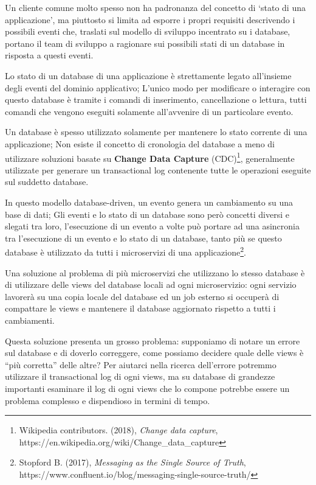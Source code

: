 \documentclass[]{article}
\begin{document}
Un cliente comune molto spesso non ha padronanza del concetto di `stato
di una applicazione', ma piuttosto si limita ad esporre i propri
requisiti descrivendo i possibili eventi che, traslati sul modello di
sviluppo incentrato su i database, portano il team di sviluppo a
ragionare sui possibili stati di un database in risposta a questi
eventi.

Lo stato di un database di una applicazione è strettamente legato
all'insieme degli eventi del dominio applicativo; L'unico modo per
modificare o interagire con questo database è tramite i comandi di
inserimento, cancellazione o lettura, tutti comandi che vengono eseguiti
solamente all'avvenire di un particolare evento.

Un database è spesso utilizzato solamente per mantenere lo stato
corrente di una applicazione; Non esiste il concetto di cronologia del
database a meno di utilizzare soluzioni basate su \textbf{Change Data
Capture} (CDC)\footnote{Wikipedia contributors. (2018), \emph{Change
  data capture},\\
  https://en.wikipedia.org/wiki/Change\_data\_capture}, generalmente
utilizzate per generare un transactional log contenente tutte le
operazioni eseguite sul suddetto database.

In questo modello database-driven, un evento genera un cambiamento su
una base di dati; Gli eventi e lo stato di un database sono però
concetti diversi e slegati tra loro, l'esecuzione di un evento a volte
può portare ad una asincronia tra l'esecuzione di un evento e lo stato
di un database, tanto più se questo database è utilizzato da tutti i
microservizi di una applicazione\footnote{Stopford B. (2017),
  \emph{Messaging as the Single Source of Truth},\\
  https://www.confluent.io/blog/messaging-single-source-truth/}.

\newpage

Una soluzione al problema di più microservizi che utilizzano lo stesso
database è di utilizzare delle views del database locali ad ogni
microservizio: ogni servizio lavorerà su una copia locale del database
ed un job esterno si occuperà di compattare le views e mantenere il
database aggiornato rispetto a tutti i cambiamenti.

Questa soluzione presenta un grosso problema: supponiamo di notare un
errore sul database e di doverlo correggere, come possiamo decidere
quale delle views è ``più corretta'' delle altre? Per aiutarci nella
ricerca dell'errore potremmo utilizzare il transactional log di ogni
views, ma su database di grandezze importanti esaminare il log di ogni
views che lo compone potrebbe essere un problema complesso e dispendioso
in termini di tempo.
\end{document}

